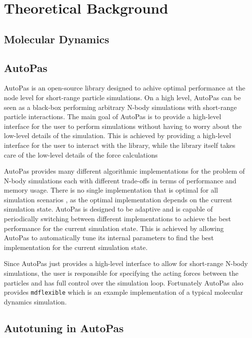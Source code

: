 \chapter{Theoretical Background}
\label{sec:theoretical_background}


\section{Molecular Dynamics}



\section{AutoPas}

AutoPas is an open-source library designed to achive optimal performance at the node level for short-range particle simulations. On a high level, AutoPas can be seen as a black-box performing arbitrary N-body simulations with short-range particle interactions. The main goal of AutoPas is to provide a high-level interface for the user to perform simulations without having to worry about the low-level details of the simulation. This is achieved by providing a high-level interface for the user to interact with the library, while the library itself takes care of the low-level details of the force calculations

AutoPas provides many different algorithmic implementations for the problem of N-body simulations each with different trade-offs in terms of performance and memory usage. There is no single implementation that is optimal for all simulation scenarios , as the optimal implementation depends on the current simulation state.
AutoPas is designed to be adaptive and is capable of periodically switching between different implementations to achieve the best performance for the current simulation state. This is achieved by allowing AutoPas to automatically tune its internal parameters to find the best implementation for the current simulation state.


Since AutoPas just provides a high-level interface to allow for short-range N-body simulations, the user is responsible for specifying the acting forces between the particles and has full control over the simulation loop. Fortunately AutoPas also provides \texttt{\gls{mdflexible}} which is an example implementation of a typical molecular dynamics simulation.

\section{Autotuning in AutoPas}

